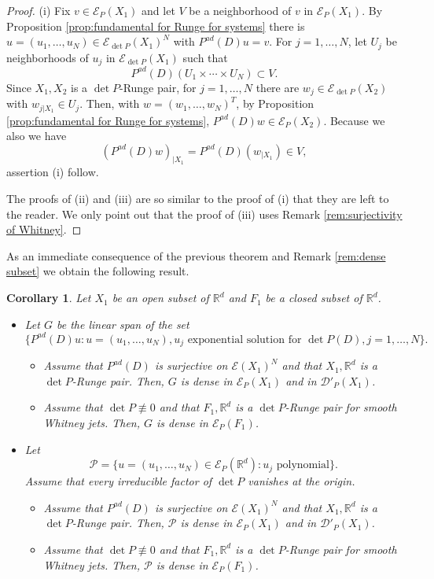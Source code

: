 \documentclass[a4paper,10pt]{amsart}
\newtheorem{corollary}[theorem]{Corollary}
\newtheorem*{crucial lemma}{Lemma \ref{lem:nice polynomial2}}
\theoremstyle{definition}
\newcommand{\R}{\mathbb{R}}
\newcommand{\Pad}{P^{ad}}
\newcommand{\detP}{\operatorname{det}\!P}
\begin{document}
\begin{proof}
	(i) Fix $v\in \mathscr{E}_P(X_1)$ and let $V$ be a neighborhood of $v$ in $\mathscr{E}_P(X_1)$. By Proposition \ref{prop:fundamental for Runge for systems} there is $u=(u_1,\ldots,u_N)\in \mathscr{E}_{\detP}(X_1)^N$ with $\Pad(D) u=v$. For $j=1,\ldots, N$, let $U_j$ be neighborhoods of $u_j$ in $\mathscr{E}_{\detP}(X_1)$ such that
	\[\Pad(D)\left(U_1\times \cdots\times U_N\right)\subset V.\]
	Since $X_1,X_2$ is a $\detP$-Runge pair, for $j=1,\ldots,N$ there are $w_j\in \mathscr{E}_{\det P}(X_2)$ with $w_{j| X_1}\in U_j$. Then, with $w=(w_1,\ldots,w_N)^T$, by Proposition \ref{prop:fundamental for Runge for systems}, $\Pad(D)w\in\mathscr{E}_P(X_2)$. Because we also we have
	\[\left(\Pad(D)w\right)_{|X_1}=\Pad(D)(w_{|X_1})\in V,\]
	assertion (i) follow.
	
	The proofs of (ii) and (iii) are so similar to the proof of (i) that they are left to the reader. We only point out that the proof of (iii) uses Remark \ref{rem:surjectivity of Whitney}.
\end{proof}

As an immediate consequence of the previous theorem and Remark \ref{rem:dense subset} we obtain the following result.

\begin{corollary}\label{cor:density of exponential solutions}
	Let $X_1$ be an open subset of $\R^d$ and $F_1$ be a closed subset of $\R^d$.
	\begin{itemize}
	\item[(a)] Let $G$ be the linear span of the set
	\[\{\Pad(D)u\colon u= (u_1,\ldots,u_N), u_j\text{ exponential solution for }\detP(D), j=1,\ldots, N \}.\]
	\begin{itemize}
		\item[(a-i)] Assume that $\Pad(D)$ is surjective on $\mathscr{E}(X_1)^N$ and that $X_1,\R^d$ is a $\detP$-Runge pair. Then, $G$ is dense in $\mathscr{E}_P(X_1)$ and in $\mathscr{D}'_P(X_1)$.
		\item[(a-ii)] Assume that $\detP\not\equiv 0$ and that $F_1, \R^d$ is a $\detP$-Runge pair for smooth Whitney jets. Then, $G$ is dense in $\mathscr{E}_P(F_1)$.
	\end{itemize}
	\item[(b)] Let
	\[\mathcal{P}=\{u=(u_1,\ldots,u_N)\in \mathscr{E}_{P}(\R^d)\colon u_j\text{ polynomial}\}.\]
	Assume that every irreducible factor of $\detP$ vanishes at the origin. 
	\begin{itemize}
		\item[(b-i)] Assume that $\Pad(D)$ is surjective on $\mathscr{E}(X_1)^N$ and that $X_1,\R^d$ is a $\detP$-Runge pair. Then, $\mathcal{P}$ is dense in $\mathscr{E}_P(X_1)$ and in $\mathscr{D}'_P(X_1)$.
		\item[(b-ii)] Assume that $\detP\not\equiv 0$ and that $F_1, \R^d$ is a $\detP$-Runge pair for smooth Whitney jets. Then, $\mathcal{P}$ is dense in $\mathscr{E}_P(F_1)$.
	\end{itemize}
	\end{itemize}
\end{corollary}
\end{document}
